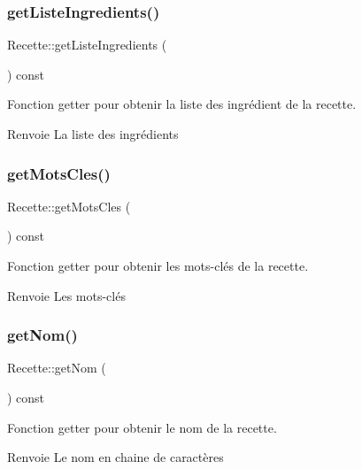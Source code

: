 \subsubsection{\texorpdfstring{get\+Liste\+Ingredients()}{getListeIngredients()}}
{\footnotesize\ttfamily Recette\+::get\+Liste\+Ingredients (\begin{DoxyParamCaption}{ }\end{DoxyParamCaption}) const}



Fonction getter pour obtenir la liste des ingrédient de la recette. 

\begin{DoxyReturn}{Renvoie}
La liste des ingrédients 
\end{DoxyReturn}
\mbox{\label{classRecette_a509d4cfe5b696a08c4b6675472d6e481}} 
\subsubsection{\texorpdfstring{get\+Mots\+Cles()}{getMotsCles()}}
{\footnotesize\ttfamily Recette\+::get\+Mots\+Cles (\begin{DoxyParamCaption}{ }\end{DoxyParamCaption}) const}



Fonction getter pour obtenir les mots-\/clés de la recette. 

\begin{DoxyReturn}{Renvoie}
Les mots-\/clés 
\end{DoxyReturn}
\mbox{\label{classRecette_afab5d7deab9130137037872a7a42ef3c}} 
\subsubsection{\texorpdfstring{get\+Nom()}{getNom()}}
{\footnotesize\ttfamily Recette\+::get\+Nom (\begin{DoxyParamCaption}{ }\end{DoxyParamCaption}) const}



Fonction getter pour obtenir le nom de la recette. 

\begin{DoxyReturn}{Renvoie}
Le nom en chaine de caractères 
\end{DoxyReturn}
\mbox{\label{classRecette_a9ac38f333d17699fb6601bca332d8567}} 
